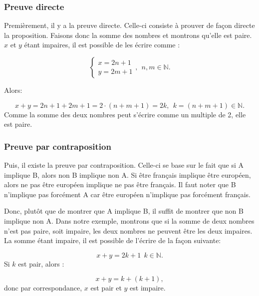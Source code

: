 \documentclass[a4paper, 12pt, french, twoside]{article}
\begin{document}
\subsubsection{Preuve directe}
Premièrement, il y a la preuve directe. Celle-ci consiste à prouver de façon directe la proposition. Faisons donc la somme des nombres et montrons qu'elle est paire. \\

$x$ et $y$ étant impaires, il est possible de les écrire comme :

\begin{equation}
    \begin{cases}
        x=2n+1\\
        y=2m+1
    \end{cases},~~ n,m\in \mathbb{N}.
\end{equation}

Alors:

\begin{equation}
    x+y=2n+1+2m+1=2\cdot(n+m+1)=2k, ~~ k=(n+m+1)\in \mathbb{N}.
\end{equation}
Comme la somme des deux nombres peut s'écrire comme un multiple de 2, elle est paire.\\

\subsubsection{Preuve par contraposition}
Puis, il existe la preuve par contraposition. Celle-ci se base sur le fait que si A implique B, alors non B implique non A. Si être français implique être européen, alors ne pas être européen implique ne pas être français. Il faut noter que B n'implique pas forcément A car être européen n'implique pas forcément français.

Donc, plutôt que de montrer que A implique B, il suffit de montrer que non B implique non A. Dans notre exemple, montrons que si la somme de deux nombres n'est pas paire, soit impaire, les deux nombres ne peuvent être les deux impaires. \\

La somme étant impaire, il est possible de l'écrire de la façon suivante:

\begin{equation}
    x+y=2k+1~~ k\in \mathbb{N}.
\end{equation}
Si $k$ est pair, alors :

\begin{equation}
    x+y=k+(k+1),
\end{equation}
donc par correspondance, $x$ est pair et $y$ est impaire. 
\end{document}
